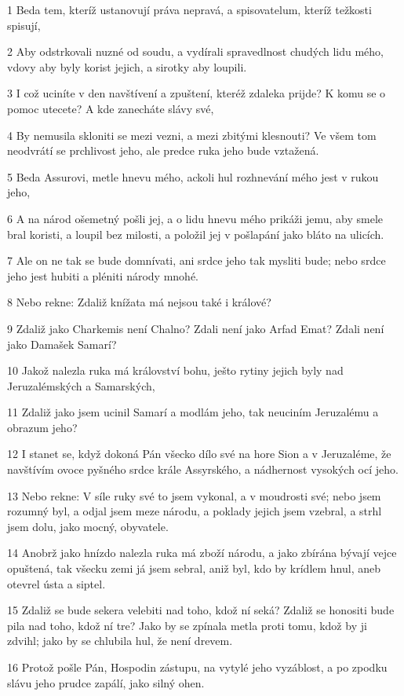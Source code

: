 \par 1 Beda tem, kteríž ustanovují práva nepravá, a spisovatelum, kteríž težkosti spisují,
\par 2 Aby odstrkovali nuzné od soudu, a vydírali spravedlnost chudých lidu mého, vdovy aby byly korist jejich, a sirotky aby loupili.
\par 3 I což uciníte v den navštívení a zpuštení, kteréž zdaleka prijde? K komu se o pomoc utecete? A kde zanecháte slávy své,
\par 4 By nemusila skloniti se mezi vezni, a mezi zbitými klesnouti? Ve všem tom neodvrátí se prchlivost jeho, ale predce ruka jeho bude vztažená.
\par 5 Beda Assurovi, metle hnevu mého, ackoli hul rozhnevání mého jest v rukou jeho,
\par 6 A na národ ošemetný pošli jej, a o lidu hnevu mého prikáži jemu, aby smele bral koristi, a loupil bez milosti, a položil jej v pošlapání jako bláto na ulicích.
\par 7 Ale on ne tak se bude domnívati, ani srdce jeho tak mysliti bude; nebo srdce jeho jest hubiti a pléniti národy mnohé.
\par 8 Nebo rekne: Zdaliž knížata má nejsou také i králové?
\par 9 Zdaliž jako Charkemis není Chalno? Zdali není jako Arfad Emat? Zdali není jako Damašek Samarí?
\par 10 Jakož nalezla ruka má království bohu, ješto rytiny jejich byly nad Jeruzalémských a Samarských,
\par 11 Zdaliž jako jsem ucinil Samarí a modlám jeho, tak neuciním Jeruzalému a obrazum jeho?
\par 12 I stanet se, když dokoná Pán všecko dílo své na hore Sion a v Jeruzaléme, že navštívím ovoce pyšného srdce krále Assyrského, a nádhernost vysokých ocí jeho.
\par 13 Nebo rekne: V síle ruky své to jsem vykonal, a v moudrosti své; nebo jsem rozumný byl, a odjal jsem meze národu, a poklady jejich jsem vzebral, a strhl jsem dolu, jako mocný, obyvatele.
\par 14 Anobrž jako hnízdo nalezla ruka má zboží národu, a jako zbírána bývají vejce opuštená, tak všecku zemi já jsem sebral, aniž byl, kdo by krídlem hnul, aneb otevrel ústa a siptel.
\par 15 Zdaliž se bude sekera velebiti nad toho, kdož ní seká? Zdaliž se honositi bude pila nad toho, kdož ní tre? Jako by se zpínala metla proti tomu, kdož by ji zdvihl; jako by se chlubila hul, že není drevem.
\par 16 Protož pošle Pán, Hospodin zástupu, na vytylé jeho vyzáblost, a po zpodku slávu jeho prudce zapálí, jako silný ohen.
